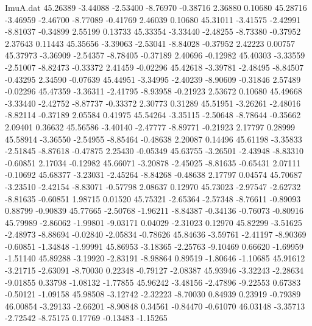 \begin{filecontents}{ImuA.dat}
  45.26389   -3.44088   -2.53400   -8.76970   -0.38716    2.36880    0.10680
  45.28716   -3.46959   -2.46700   -8.77089   -0.41769    2.46039    0.10680
  45.31011   -3.41575   -2.42991   -8.81037   -0.34899    2.55199    0.13733
  45.33354   -3.33440   -2.48255   -8.73380   -0.37952    2.37643    0.11443
  45.35656   -3.39063   -2.53041   -8.84028   -0.37952    2.42223    0.00757
  45.37973   -3.36909   -2.54357   -8.78405   -0.37189    2.40696   -0.12982
  45.40303   -3.33559   -2.51007   -8.82473   -0.33372    2.41459   -0.02296
  45.42618   -3.39781   -2.48495   -8.84507   -0.43295    2.34590   -0.07639
  45.44951   -3.34995   -2.40239   -8.90609   -0.31846    2.57489   -0.02296
  45.47359   -3.36311   -2.41795   -8.93958   -0.21923    2.53672    0.10680
  45.49668   -3.33440   -2.42752   -8.87737   -0.33372    2.30773    0.31289
  45.51951   -3.26261   -2.48016   -8.82114   -0.37189    2.05584    0.41975
  45.54264   -3.35115   -2.50648   -8.78644   -0.35662    2.09401    0.36632
  45.56586   -3.40140   -2.47777   -8.89771   -0.21923    2.17797    0.28999
  45.58914   -3.36550   -2.54955   -8.85464   -0.48638    2.20087    0.14496
  45.61198   -3.35833   -2.51845   -8.87618   -0.47875    2.25430   -0.05349
  45.63755   -3.26501   -2.43948   -8.83310   -0.60851    2.17034   -0.12982
  45.66071   -3.20878   -2.45025   -8.81635   -0.65431    2.07111   -0.10692
  45.68377   -3.23031   -2.45264   -8.84268   -0.48638    2.17797    0.04574
  45.70687   -3.23510   -2.42154   -8.83071   -0.57798    2.08637    0.12970
  45.73023   -2.97547   -2.62732   -8.81635   -0.60851    1.98715    0.01520
  45.75321   -2.65364   -2.57348   -8.76611   -0.89093    0.88799   -0.90839
  45.77665   -2.50768   -1.96211   -8.84387   -0.34136   -0.76073   -0.80916
  45.79989   -2.86062   -1.99801   -9.03171    0.04029   -2.31023    0.12970
  45.82299   -3.51625   -2.48973   -8.88694   -0.02840   -2.05834   -0.78626
  45.84636   -3.59761   -2.41197   -8.90369   -0.60851   -1.34848   -1.99991
  45.86953   -3.18365   -2.25763   -9.10469    0.66620   -1.69959   -1.51140
  45.89288   -3.19920   -2.83191   -8.98864    0.89519   -1.80646   -1.10685
  45.91612   -3.21715   -2.63091   -8.70030    0.22348   -0.79127   -2.08387
  45.93946   -3.32243   -2.28634   -9.01855    0.33798   -1.08132   -1.77855
  45.96242   -3.48156   -2.47896   -9.22553    0.67383   -0.50121   -1.09158
  45.98508   -3.12742   -2.32223   -8.70030    0.84939    0.23919   -0.79389
  46.00854   -3.29133   -2.66201   -8.90848    0.34561   -0.84470   -0.61070
  46.03148   -3.35713   -2.72542   -8.75175    0.17769   -0.13483   -1.15265

\end{filecontents}
